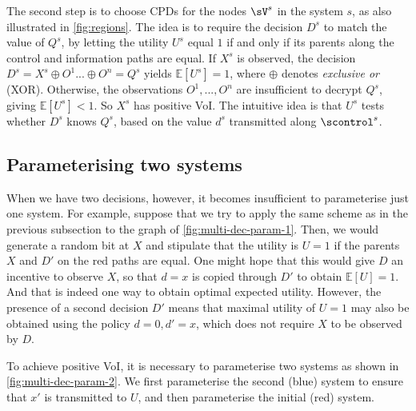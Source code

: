 The second step is to choose CPDs for the nodes $\sV^s$ in the system $s$, as also illustrated in \cref{fig:regions}.
The idea is to require
the decision $D^s$ to match the value of $Q^s$, by letting
the utility $U^s$ equal $1$ if and only if its parents along the control 
and information paths are equal.
If $X^s$ is observed, the decision $D^s=X^s \oplus O^1 ... \oplus O^n=Q^s$
yields $\mathbb{E}[U^s]=1$, where $\oplus$ denotes \emph{exclusive or} (XOR).
Otherwise, the observations $O^1,...,O^n$ are insufficient to decrypt $Q^s$, 
giving $\mathbb{E}[U^s]<1$.
So $X^s$ has positive VoI.
The intuitive idea is that $U^s$ tests whether $D^s$ knows $Q^s$, 
based on the value $d^s$ transmitted along $\scontrol^s$.~






\subsection{Parameterising two systems} 


When we have two decisions, however, it becomes insufficient to parameterise just one system.
For example, suppose that we try to apply 
the same scheme as in the previous subsection
to the graph of \cref{fig:multi-dec-param-1}.
Then, we would generate a random bit at $X$ and stipulate that the utility is $U=1$
if the parents $X$ and $D'$ on the red paths are equal.
One might hope that this would give $D$ an incentive to observe $X$, so that $d=x$ is copied through $D'$ to obtain $\mathbb{E}[U]=1$.
And that is indeed one way to obtain optimal expected utility.
However, the presence of a second decision $D'$ means that maximal utility of $U=1$ may also be obtained using the policy $d=0,d'=x$, 
which does not require $X$ to be observed by $D$.~

To achieve positive VoI, it is necessary to parameterise two systems as shown in \cref{fig:multi-dec-param-2}.
We first parameterise the second (blue) system 
to ensure that $x'$ is transmitted to $U$, 
and then parameterise the initial (red) system. 

